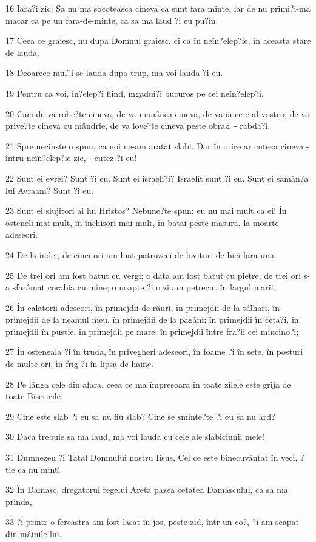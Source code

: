 \par 16 Iara?i zic: Sa nu ma socoteasca cineva ca sunt fara minte, iar de nu primi?i-ma macar ca pe un fara-de-minte, ca sa ma laud ?i eu pu?in.
\par 17 Ceea ce graiesc, nu dupa Domnul graiesc, ci ca în neîn?elep?ie, în aceasta stare de lauda.
\par 18 Deoarece mul?i se lauda dupa trup, ma voi lauda ?i eu.
\par 19 Pentru ca voi, în?elep?i fiind, îngadui?i bucuros pe cei neîn?elep?i.
\par 20 Caci de va robe?te cineva, de va manânca cineva, de va ia ce e al vostru, de va prive?te cineva cu mândrie, de va love?te cineva peste obraz, - rabda?i.
\par 21 Spre necinste o spun, ca noi ne-am aratat slabi. Dar în orice ar cuteza cineva - întru neîn?elep?ie zic, - cutez ?i eu!
\par 22 Sunt ei evrei? Sunt ?i eu. Sunt ei israeli?i? Israelit sunt ?i eu. Sunt ei samân?a lui Avraam? Sunt ?i eu.
\par 23 Sunt ei slujitori ai lui Hristos? Nebune?te spun: eu nu mai mult ca ei! În osteneli mai mult, în închisori mai mult, în batai peste masura, la moarte adeseori.
\par 24 De la iudei, de cinci ori am luat patruzeci de lovituri de bici fara una.
\par 25 De trei ori am fost batut cu vergi; o data am fost batut cu pietre; de trei ori s-a sfarâmat corabia cu mine; o noapte ?i o zi am petrecut în largul marii.
\par 26 În calatorii adeseori, în primejdii de râuri, în primejdii de la tâlhari, în primejdii de la neamul meu, în primejdii de la pagâni; în primejdii în ceta?i, în primejdii în pustie, în primejdii pe mare, în primejdii între fra?ii cei mincino?i;
\par 27 În osteneala ?i în truda, în privegheri adeseori, în foame ?i în sete, în posturi de multe ori, în frig ?i în lipsa de haine.
\par 28 Pe lânga cele din afara, ceea ce ma împresoara în toate zilele este grija de toate Bisericile.
\par 29 Cine este slab ?i eu sa nu fiu slab? Cine se sminte?te ?i eu sa nu ard?
\par 30 Daca trebuie sa ma laud, ma voi lauda cu cele ale slabiciunii mele!
\par 31 Dumnezeu ?i Tatal Domnului nostru Iisus, Cel ce este binecuvântat în veci, ?tie ca nu mint!
\par 32 În Damasc, dregatorul regelui Areta pazea cetatea Damascului, ca sa ma prinda,
\par 33 ?i printr-o fereastra am fost lasat în jos, peste zid, într-un co?, ?i am scapat din mâinile lui.

